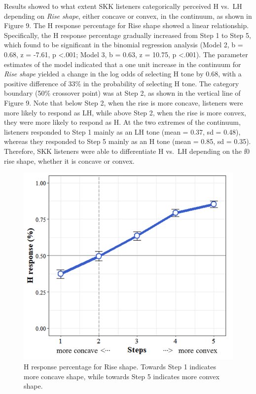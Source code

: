 \documentclass[
  man,floatsintext]{apa6}
\begin{document}
Results showed to what extent SKK listeners categorically perceived H vs.~LH depending on \emph{Rise shape}, either concave or convex, in the continuum, as shown in Figure 9. The H response percentage for Rise shape showed a linear relationship. Specifically, the H response percentage gradually increased from Step 1 to Step 5, which found to be significant in the binomial regression analysis (Model 2, b = 0.68, z = -7.61, p \textless.001; Model 3, b = 0.63, z = 10.75, p \textless.001). The parameter estimates of the model indicated that a one unit increase in the continuum for \emph{Rise shape} yielded a change in the log odds of selecting H tone by 0.68, with a positive difference of 33\% in the probability of selecting H tone. The category boundary (50\% crossover point) was at Step 2, as shown in the vertical line of Figure 9. Note that below Step 2, when the rise is more concave, listeners were more likely to respond as LH, while above Step 2, when the rise is more convex, they were more likely to respond as H. At the two extremes of the continuum, listeners responded to Step 1 mainly as an LH tone (mean = 0.37, sd = 0.48), whereas they responded to Step 5 mainly as an H tone (mean = 0.85, sd = 0.35). Therefore, SKK listeners were able to differentiate H vs.~LH depending on the f0 rise shape, whether it is concave or convex.

\begin{figure}[H]

{\centering \includegraphics[width=1\linewidth]{images/picture9} 

}

\caption{H response percentage for Rise shape. Towards Step 1 indicates more concave shape, while towards Step 5 indicates more convex shape. }\label{fig:picture9}
\end{figure}
\end{document}

